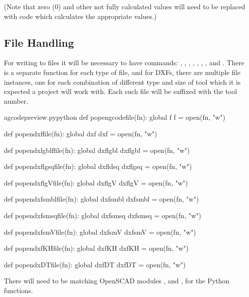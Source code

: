 \documentclass{ltxdoc}
\begin{document}
(Note that zero (0) and other not fully calculated values will need to be replaced 
with code which calculates the appropriate values.)
 
\subsection{File Handling}
 
For writing to files it will be necessary to have commands: 
, 
, 
, 
, 
, 
,  
, and 
.
There is a separate function for each type of file, and for DXFs, there are multiple file
instances, one for each combination of different type and size of tool which it is expected 
a project will work with. Each such file will be suffixed with the tool number.

\lstset{firstnumber=\thegcpy}
\begin{writecode}{a}{gcodepreview.py}{python}
def popengcodefile(fn):
    global f
    f = open(fn, "w")

def popendxffile(fn):
    global dxf
    dxf = open(fn, "w")

def popendxlgblffile(fn):
    global dxflgbl
    dxflgbl = open(fn, "w")

def popendxflgsqfile(fn):
    global dxfldsq
    dxflgsq = open(fn, "w")

def popendxflgVfile(fn):
    global dxflgV
    dxflgV = open(fn, "w")

def popendxfsmblfile(fn):
    global dxfsmbl
    dxfsmbl = open(fn, "w")

def popendxfsmsqfile(fn):
    global dxfsmsq
    dxfsmsq = open(fn, "w")

def popendxfsmVfile(fn):
    global dxfsmV
    dxfsmV = open(fn, "w")

def popendxfKHfile(fn):
    global dxfKH
    dxfKH = open(fn, "w")

def popendxDTfile(fn):
    global dxfDT
    dxfDT = open(fn, "w")

\end{writecode}
\addtocounter{gcpy}{40}

There will need to be matching OpenSCAD modules 
, and
, 
for the Python functions.
\end{document}
